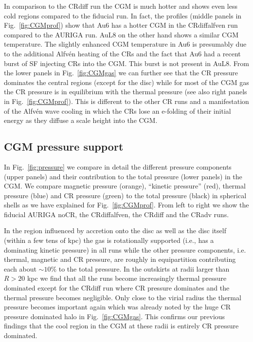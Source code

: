 \documentclass[useAMS,usenatbib]{mnras}
\begin{document}
In comparison to the CRdiff run the CGM is much hotter and shows even less cold regions compared to the fiducial run. In fact, the profiles (middle panels in Fig.\ \ref{fig:CGMprof}) show that Au6 has a hotter CGM in the CRdiffalfven run compared to the AURIGA run. AuL8 on the other hand shows a similar CGM temperature. The slightly enhanced CGM temperature in Au6 is presumably due to the additional Alfv\'en heating of the CRs and the fact that Au6 had a recent burst of SF injecting CRs into the CGM. This burst is not present in AuL8. From the lower panels in Fig.\ \ref{fig:CGMgas} we can further see that the CR pressure dominates the central regions (except for the disc) while for most of the CGM gas the CR pressure is in equilibrium with the thermal pressure (see also right panels in Fig.\ \ref{fig:CGMprof}). This is different to the other CR runs and a manifestation of the Alfv\'en wave cooling in which the CRs lose an e-folding of their initial energy as they diffuse a scale height into the CGM. 

\subsection{CGM pressure support}
In Fig.\ \ref{fig:pressure} we compare in detail the different pressure components (upper panels) and their contribution to the total pressure (lower panels) in the CGM. We compare magnetic pressure (orange), ``kinetic pressure'' (red), thermal pressure (blue) and CR pressure (green) to the total pressure (black) in spherical shells as we have explained for Fig.\ \ref{fig:CGMprof}. From left to right we show the fiducial AURIGA noCR, the CRdiffalfven, the CRdiff and the CRadv runs. 

In the region influenced by accretion onto the disc as well as the disc itself (within a few tens of kpc) the gas is rotationally supported (i.e., has a dominating kinetic pressure) in all runs while the other pressure components, i.e. thermal, magnetic and CR pressure, are roughly in equipartition contributing each about $\sim10$\% to the total pressure. In the outskirts at radii larger than $R>20$ kpc we find that all the runs become increasingly thermal pressure dominated except for the CRdiff run where CR pressure dominates and the thermal pressure becomes negligible. Only close to the virial radius the thermal pressure becomes important again which was already noted by the huge CR pressure dominated halo in Fig.\ \ref{fig:CGMgas}. This confirms our previous findings that the cool region in the CGM at these radii is entirely CR pressure dominated.
\end{document}
